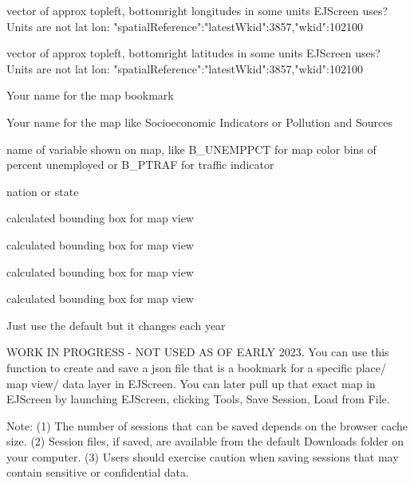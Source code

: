 \documentclass[a4paper]{book}
\begin{document}
%
\begin{Arguments}
\begin{ldescription}
\item[\code{x}] vector of approx topleft, bottomright longitudes in some units EJScreen uses?
Units are not lat lon: "spatialReference":"latestWkid":3857,"wkid":102100

\item[\code{y}] vector of approx topleft, bottomright latitudes in some units EJScreen uses?
Units are not lat lon: "spatialReference":"latestWkid":3857,"wkid":102100

\item[\code{name}] Your name for the map bookmark

\item[\code{title}] Your name for the map like Socioeconomic Indicators  or  Pollution and Sources

\item[\code{renderField}] name of variable shown on map, like B\_UNEMPPCT for map color bins of percent unemployed
or B\_PTRAF for traffic indicator

\item[\code{pctlevel}] nation or state

\item[\code{xmin}] calculated bounding box for map view

\item[\code{xmax}] calculated bounding box for map view

\item[\code{ymin}] calculated bounding box for map view

\item[\code{ymax}] calculated bounding box for map view

\item[\code{urlrest}] Just use the default but it changes each year
\end{ldescription}
\end{Arguments}
%
\begin{Details}\relax
WORK IN PROGRESS - NOT USED AS OF EARLY 2023.
You can use this function to create and save a json file that is a bookmark
for a specific place/ map view/ data layer in EJScreen.
You can later pull up that exact map in EJScreen by launching EJScreen,
clicking Tools, Save Session, Load from File.

Note:
(1) The number of sessions that can be saved depends on the browser cache size.
(2) Session files, if saved, are available from the default Downloads folder on your computer.
(3) Users should exercise caution when saving sessions that may contain sensitive or confidential data.
\end{Details}
\end{document}
